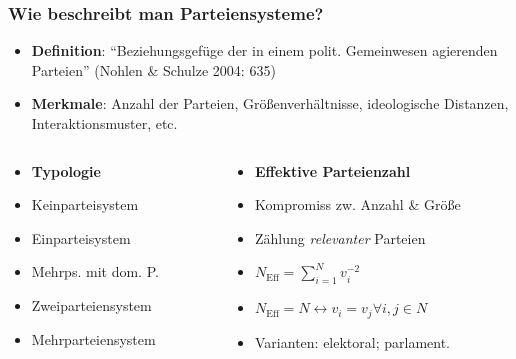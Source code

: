 \documentclass{beamer}
\begin{document}
\begin{frame}
  \frametitle{Wie beschreibt man Parteiensysteme?}
  \begin{itemize}
    \item \textbf{Definition}: ``Beziehungsgefüge der in einem polit. Gemeinwesen agierenden Parteien'' (Nohlen \& Schulze 2004: 635)
    \item \textbf{Merkmale}: Anzahl der Parteien, Größenverhältnisse, ideologische Distanzen, Interaktionsmuster, etc.
  \end{itemize}
  \begin{columns}
    \begin{column}{.4\linewidth}
    \begin{itemize}
      \item [] \textbf{Typologie}
      \item Keinparteisystem
      \item Einparteisystem
      \item Mehrps. mit dom. P.
      \item Zweiparteiensystem
      \item Mehrparteiensystem
    \end{itemize}
    \end{column}
    \begin{column}{.6\linewidth}
      \begin{itemize}
        \item [] \textbf{Effektive Parteienzahl}
        \item Kompromiss zw. Anzahl \& Größe
        \item Zählung \textit{relevanter} Parteien
        \item $N_{\text{Eff}} = \sum_{i=1}^N v_i^{-2}$
        \item $N_{\text{Eff}} = N \leftrightarrow v_i = v_j \forall i,j \in N$
        \item Varianten: elektoral; parlament.
      \end{itemize}
    \end{column}
  \end{columns}
\end{frame}
\end{document}
